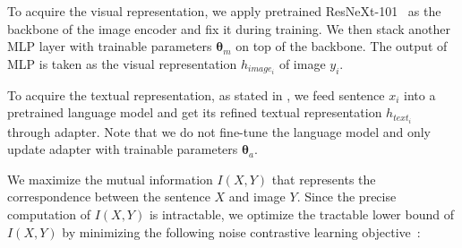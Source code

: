 To acquire the visual representation, we apply pretrained ResNeXt-101~\citep{resnext} as the backbone of the image encoder and fix it during training. We then stack another MLP layer with trainable parameters $\bm{\theta}_m$ on top of the backbone. The output of MLP is taken as the visual representation $h_{image_{i}}$ of image $y_i$.

To acquire the textual representation, as stated in , we feed sentence $x_i$ into a pretrained language model and get its refined textual representation $h_{text_i}$ through adapter. Note that we do not fine-tune the language model and only update adapter with trainable parameters $\bm{\theta}_{a}$.

We maximize the mutual information $I(X, Y)$ that represents the correspondence between the sentence $X$ and image $Y$. Since the precise computation of $I(X, Y)$ is intractable, we optimize the tractable lower bound of $I(X, Y)$ by minimizing the following noise contrastive learning objective~\citep{infoNCE}:
